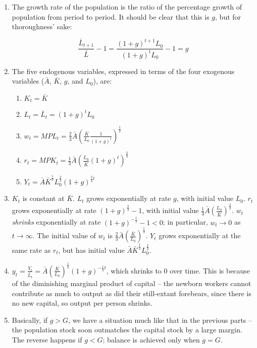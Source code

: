 \documentclass{article}
\newenvironment{solution}{\color{red}}{\color{black}}
\begin{document}
\begin{solution}

\begin{enumerate}
\item The growth rate of the population is the ratio of the percentage growth of population from period to period. It should be clear that this is $g$, but for thoroughness' sake:

\[ \frac{\bar{L}_{t+1}}{\bar{L}} - 1 = \frac{(1+g)^{t+1} L_0}{(1+g)^t L_0} - 1 = g \]

\item The five endogenous variables, expressed in terms of the four exogenous variables ($\bar{A}$, $\bar{K}$, $g$, and $L_0$), are:

\begin{enumerate}
\item $K_t = \bar{K}$
\item $L_t = \bar{L}_t = (1+g)^t L_0$
\item $w_t = MPL_t = \frac23 \bar{A} \left( \frac{\bar{K}}{L_0} \frac1{(1+g)^t} \right)^\frac13$
\item $r_t = MPK_t = \frac13 \bar{A} \left( \frac{L_0}{\bar{K}} (1+g)^t \right)^\frac23$
\item $Y_t = \bar{A} \bar{K}^\frac13 L_0^\frac23 (1+g)^{\frac23 t}$
\end{enumerate}

\item $K_t$ is constant at $\bar{K}$. $L_t$ grows exponentially at rate $g$, with initial value $L_0$. $r_t$ grows exponentially at rate $(1+g)^\frac23 - 1$, with initial value $\frac13 \bar{A} \left( \frac{L_0}{\bar{K}} \right)^\frac23$. $w_t$ \textit{shrinks} exponentially at rate $(1+g)^{-\frac13} - 1 < 0$; in particular, $w_t \rightarrow 0$ as $t \rightarrow \infty$. The initial value of $w_t$ is $\frac23 \bar{A} \left( \frac{\bar{K}}{L_0} \right)^\frac13$. $Y_t$ grows exponentially at the same rate as $r_t$, but has initial value $\bar{A} \bar{K}^\frac13 L_0^\frac23$.

\item $y_t = \frac{Y_t}{\bar{L}_t} = \bar{A} \left( \frac{\bar{K}}{L_0} \right)^\frac13 (1+g)^{-\frac13 t}$, which shrinks to 0 over time. This is because of the diminishing marginal product of capital -- the newborn workers cannot contribute as much to output as did their still-extant forebears, since there is no new capital, so output per person shrinks.

\item Basically, if $g > G$, we have a situation much like that in the previous parts -- the population stock soon outmatches the capital stock by a large margin. The reverse happens if $g < G$; balance is achieved only when $g = G$.
\end{enumerate}

\end{solution}
\end{document}
